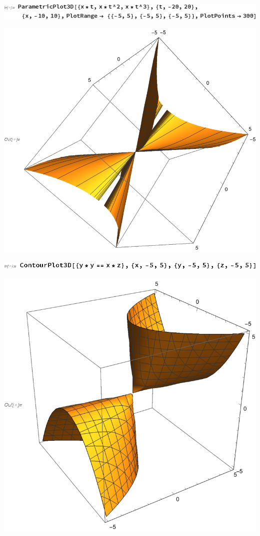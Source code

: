 \documentclass{article}
\begin{document}
\includegraphics{gr_gr5.eps}

\includegraphics{gr_gr6.eps}

\includegraphics{gr_gr7.eps}

\includegraphics{gr_gr8.eps}
\end{document}

